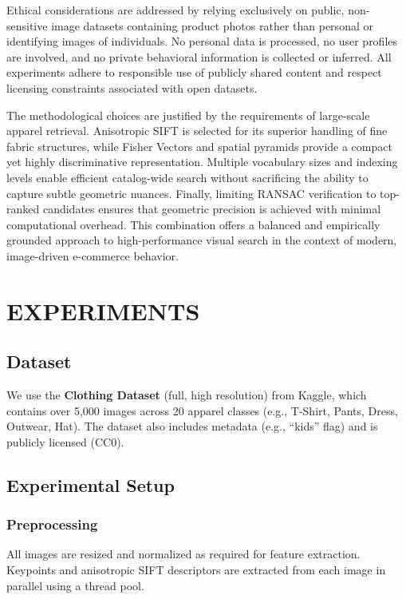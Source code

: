 \documentclass[conference]{IEEEtran}
\begin{document}
Ethical considerations are addressed by relying exclusively on public, non-sensitive image datasets containing product photos rather than personal or identifying images of individuals. No personal data is processed, no user profiles are involved, and no private behavioral information is collected or inferred. All experiments adhere to responsible use of publicly shared content and respect licensing constraints associated with open datasets.

The methodological choices are justified by the requirements of large-scale apparel retrieval. Anisotropic SIFT is selected for its superior handling of fine fabric structures, while Fisher Vectors and spatial pyramids provide a compact yet highly discriminative representation. Multiple vocabulary sizes and indexing levels enable efficient catalog-wide search without sacrificing the ability to capture subtle geometric nuances. Finally, limiting RANSAC verification to top-ranked candidates ensures that geometric precision is achieved with minimal computational overhead. This combination offers a balanced and empirically grounded approach to high-performance visual search in the context of modern, image-driven e-commerce behavior.


\section{EXPERIMENTS}
\subsection{Dataset}

We use the \textbf{Clothing Dataset} (full, high resolution) from Kaggle, which contains over 5,000 images across 20 apparel classes (e.g., T-Shirt, Pants, Dress, Outwear, Hat). The dataset also includes metadata (e.g., “kids” flag) and is publicly licensed (CC0).

\subsection{Experimental Setup}

\subsubsection{Preprocessing}
All images are resized and normalized as required for feature extraction.
Keypoints and anisotropic SIFT descriptors are extracted from each image in parallel using a thread pool.
\end{document}
